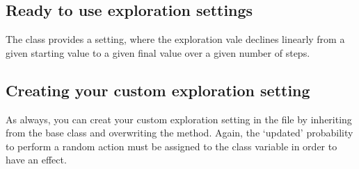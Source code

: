\documentclass[letterpaper,10pt,english]{sphinxmanual}
\begin{document}
\subsection{Ready to use exploration settings}
\label{\detokenize{MultiAgentMarketRL:ready-to-use-exploration-settings}}
\sphinxAtStartPar
The  class provides a setting, where the exploration vale declines linearly from a given
starting value to a given final value over a given number of steps.


\subsection{Creating your custom exploration setting}
\label{\detokenize{MultiAgentMarketRL:creating-your-custom-exploration-setting}}
\sphinxAtStartPar
As always, you can creat your custom exploration setting in the  file by inheriting from the
 base class and overwriting the  method. Again, the ‘updated’ probability to perform
a random action must be assigned to the  class variable in order to have an effect.

\begin{sphinxVerbatim}[commandchars=\\\{\},numbers=left,firstnumber=1,stepnumber=1]
 

     
       

        

    

        

           
\end{sphinxVerbatim}
\end{document}
